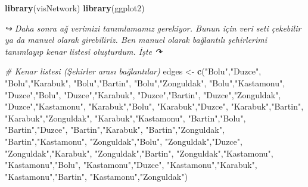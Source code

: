 \documentclass[
]{article}
\newenvironment{Shaded}{\begin{snugshade}}{\end{snugshade}}
\newcommand{\CommentTok}[1]{\textcolor[rgb]{0.56,0.35,0.01}{\textit{#1}}}
\newcommand{\FunctionTok}[1]{\textcolor[rgb]{0.13,0.29,0.53}{\textbf{#1}}}
\newcommand{\NormalTok}[1]{#1}
\newcommand{\OtherTok}[1]{\textcolor[rgb]{0.56,0.35,0.01}{#1}}
\newcommand{\StringTok}[1]{\textcolor[rgb]{0.31,0.60,0.02}{#1}}
\begin{document}
\begin{Shaded}
\begin{Highlighting}[]
\FunctionTok{library}\NormalTok{(visNetwork)}
\FunctionTok{library}\NormalTok{(ggplot2)}
\end{Highlighting}
\end{Shaded}

\emph{↪ Daha sonra ağ verimizi tanımlamamız gerekiyor. Bunun için veri
seti çekebilir ya da manuel olarak} \emph{girebiliriz. Ben manuel olarak
bağlantılı şehirlerimi tanımlayıp kenar listesi oluşturdum. İşte ↷}

\begin{Shaded}
\begin{Highlighting}[]
\CommentTok{\# Kenar listesi (Şehirler arası bağlantılar)}
\NormalTok{edges }\OtherTok{\textless{}{-}} \FunctionTok{c}\NormalTok{(}\StringTok{"Bolu"}\NormalTok{,}\StringTok{"Duzce"}\NormalTok{, }\StringTok{"Bolu"}\NormalTok{,}\StringTok{"Karabuk"}\NormalTok{, }\StringTok{"Bolu"}\NormalTok{,}\StringTok{"Bartin"}\NormalTok{, }\StringTok{"Bolu"}\NormalTok{,}\StringTok{"Zonguldak"}\NormalTok{, }\StringTok{"Bolu"}\NormalTok{,}\StringTok{"Kastamonu"}\NormalTok{,}
           \StringTok{"Duzce"}\NormalTok{,}\StringTok{"Bolu"}\NormalTok{, }\StringTok{"Duzce"}\NormalTok{,}\StringTok{"Karabuk"}\NormalTok{, }\StringTok{"Duzce"}\NormalTok{,}\StringTok{"Bartin"}\NormalTok{, }\StringTok{"Duzce"}\NormalTok{,}\StringTok{"Zonguldak"}\NormalTok{, }\StringTok{"Duzce"}\NormalTok{,}\StringTok{"Kastamonu"}\NormalTok{,}
           \StringTok{"Karabuk"}\NormalTok{,}\StringTok{"Bolu"}\NormalTok{, }\StringTok{"Karabuk"}\NormalTok{,}\StringTok{"Duzce"}\NormalTok{, }\StringTok{"Karabuk"}\NormalTok{,}\StringTok{"Bartin"}\NormalTok{, }\StringTok{"Karabuk"}\NormalTok{,}\StringTok{"Zonguldak"}\NormalTok{, }\StringTok{"Karabuk"}\NormalTok{,}\StringTok{"Kastamonu"}\NormalTok{,}
           \StringTok{"Bartin"}\NormalTok{,}\StringTok{"Bolu"}\NormalTok{, }\StringTok{"Bartin"}\NormalTok{,}\StringTok{"Duzce"}\NormalTok{, }\StringTok{"Bartin"}\NormalTok{,}\StringTok{"Karabuk"}\NormalTok{, }\StringTok{"Bartin"}\NormalTok{,}\StringTok{"Zonguldak"}\NormalTok{, }\StringTok{"Bartin"}\NormalTok{,}\StringTok{"Kastamonu"}\NormalTok{,}
           \StringTok{"Zonguldak"}\NormalTok{,}\StringTok{"Bolu"}\NormalTok{, }\StringTok{"Zonguldak"}\NormalTok{,}\StringTok{"Duzce"}\NormalTok{, }\StringTok{"Zonguldak"}\NormalTok{,}\StringTok{"Karabuk"}\NormalTok{, }\StringTok{"Zonguldak"}\NormalTok{,}\StringTok{"Bartin"}\NormalTok{, }\StringTok{"Zonguldak"}\NormalTok{,}\StringTok{"Kastamonu"}\NormalTok{,}
           \StringTok{"Kastamonu"}\NormalTok{,}\StringTok{"Bolu"}\NormalTok{, }\StringTok{"Kastamonu"}\NormalTok{,}\StringTok{"Duzce"}\NormalTok{, }\StringTok{"Kastamonu"}\NormalTok{,}\StringTok{"Karabuk"}\NormalTok{, }\StringTok{"Kastamonu"}\NormalTok{,}\StringTok{"Bartin"}\NormalTok{, }\StringTok{"Kastamonu"}\NormalTok{,}\StringTok{"Zonguldak"}\NormalTok{)}


\end{Highlighting}
\end{Shaded}
\end{document}
